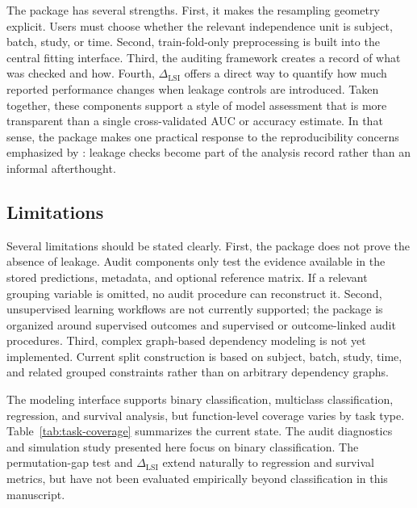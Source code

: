 \documentclass[article,shortnames]{jss}
\begin{document}
The package has several strengths. First, it makes the resampling geometry
explicit. Users must choose whether the relevant independence unit is subject,
batch, study, or time. Second, train-fold-only preprocessing is built into the
central fitting interface. Third, the auditing framework creates a record of
what was checked and how. Fourth, $\Delta_{\mathrm{LSI}}$ offers a direct way to
quantify how much reported performance changes when leakage controls are
introduced. Taken together, these components support a style of model
assessment that is more transparent than a single cross-validated AUC or
accuracy estimate. In that sense, the package makes one practical response to
the reproducibility concerns emphasized by \citet{kapoor2023}: leakage
checks become part of the analysis record rather than an informal afterthought.

\subsection{Limitations}

Several limitations should be stated clearly. First, the package does not prove
the absence of leakage. Audit components only test the evidence available in
the stored predictions, metadata, and optional reference matrix. If a relevant
grouping variable is omitted, no audit procedure can reconstruct it. Second,
unsupervised learning workflows are not currently supported; the package is
organized around supervised outcomes and supervised or outcome-linked audit
procedures. Third, complex graph-based dependency modeling is not yet
implemented. Current split construction is based on subject, batch, study,
time, and related grouped constraints rather than on arbitrary dependency
graphs.

The modeling interface supports binary classification, multiclass
classification, regression, and survival analysis, but function-level
coverage varies by task type. Table~\ref{tab:task-coverage} summarizes the
current state. The audit diagnostics and simulation study presented here focus
on binary classification. The permutation-gap test and $\Delta_{\mathrm{LSI}}$
extend naturally to regression and survival metrics, but have not been
evaluated empirically beyond classification in this manuscript.
\end{document}
